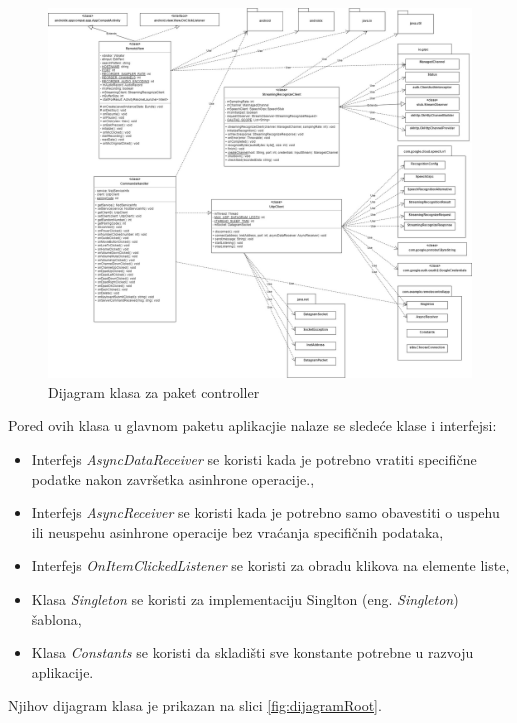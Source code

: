 \documentclass[implementacija.tex]{subfiles}
\begin{document}
\begin{figure}[!ht]
  \centering
  \includegraphics[width=\textwidth]{Implementacija/dijagrami/controller_package_class_diagram.jpg}
  \caption{Dijagram klasa za paket controller}
  \label{fig:dijagramController}
\end{figure}

Pored ovih klasa u glavnom paketu aplikacjie nalaze se sledeće klase i interfejsi:
\begin{itemize}
\item Interfejs \textit{AsyncDataReceiver} se koristi kada je potrebno vratiti specifične podatke nakon završetka asinhrone operacije.,
\item Interfejs \textit{AsyncReceiver} se koristi kada je potrebno samo obavestiti o uspehu ili neuspehu asinhrone operacije bez vraćanja specifičnih podataka,
\item Interfejs \textit{OnItemClickedListener} se koristi za obradu klikova na elemente liste,
\item Klasa \textit{Singleton} se koristi za implementaciju Singlton (eng. \textit{Singleton}) šablona,
\item Klasa \textit{Constants} se koristi da skladišti sve konstante potrebne u razvoju aplikacije.
\end{itemize}
Njihov dijagram klasa je prikazan na slici \ref{fig:dijagramRoot}.
\end{document}
